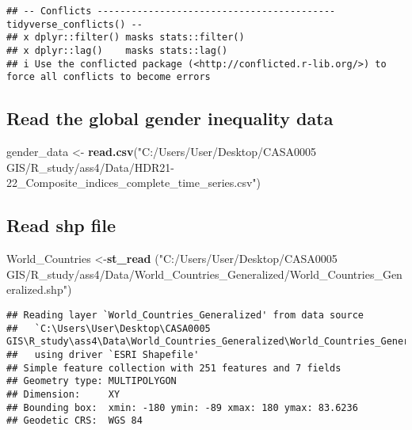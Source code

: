 \documentclass[
]{article}
\newenvironment{Shaded}{\begin{snugshade}}{\end{snugshade}}
\newcommand{\FunctionTok}[1]{\textcolor[rgb]{0.13,0.29,0.53}{\textbf{#1}}}
\newcommand{\NormalTok}[1]{#1}
\newcommand{\OtherTok}[1]{\textcolor[rgb]{0.56,0.35,0.01}{#1}}
\newcommand{\StringTok}[1]{\textcolor[rgb]{0.31,0.60,0.02}{#1}}
\begin{document}
\begin{verbatim}
## -- Conflicts ------------------------------------------ tidyverse_conflicts() --
## x dplyr::filter() masks stats::filter()
## x dplyr::lag()    masks stats::lag()
## i Use the conflicted package (<http://conflicted.r-lib.org/>) to force all conflicts to become errors
\end{verbatim}

\hypertarget{read-the-global-gender-inequality-data}{%
\subsection{Read the global gender inequality
data}\label{read-the-global-gender-inequality-data}}

\begin{Shaded}
\begin{Highlighting}[]
\NormalTok{gender\_data }\OtherTok{\textless{}{-}} \FunctionTok{read.csv}\NormalTok{(}\StringTok{"C:/Users/User/Desktop/CASA0005 GIS/R\_study/ass4/Data/HDR21{-}22\_Composite\_indices\_complete\_time\_series.csv"}\NormalTok{)}
\end{Highlighting}
\end{Shaded}

\hypertarget{read-shp-file}{%
\subsection{Read shp file}\label{read-shp-file}}

\begin{Shaded}
\begin{Highlighting}[]
\NormalTok{World\_Countries }\OtherTok{\textless{}{-}}\FunctionTok{st\_read}\NormalTok{ (}\StringTok{"C:/Users/User/Desktop/CASA0005 GIS/R\_study/ass4/Data/World\_Countries\_Generalized/World\_Countries\_Generalized.shp"}\NormalTok{)}
\end{Highlighting}
\end{Shaded}

\begin{verbatim}
## Reading layer `World_Countries_Generalized' from data source 
##   `C:\Users\User\Desktop\CASA0005 GIS\R_study\ass4\Data\World_Countries_Generalized\World_Countries_Generalized.shp' 
##   using driver `ESRI Shapefile'
## Simple feature collection with 251 features and 7 fields
## Geometry type: MULTIPOLYGON
## Dimension:     XY
## Bounding box:  xmin: -180 ymin: -89 xmax: 180 ymax: 83.6236
## Geodetic CRS:  WGS 84
\end{verbatim}
\end{document}
